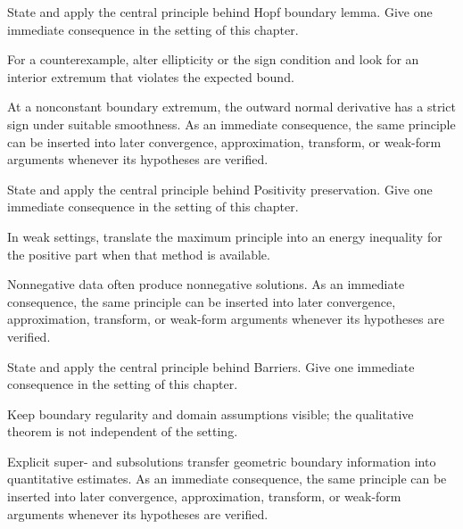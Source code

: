 \begin{exercise}\label{exr:iii27-06}
State and apply the central principle behind Hopf boundary lemma. Give one immediate consequence in the setting of this chapter.
\end{exercise}
\begin{hint}
For a counterexample, alter ellipticity or the sign condition and look for an interior extremum that violates the expected bound.
\end{hint}
\begin{solution}
At a nonconstant boundary extremum, the outward normal derivative has a strict sign under suitable smoothness. As an immediate consequence, the same principle can be inserted into later convergence, approximation, transform, or weak-form arguments whenever its hypotheses are verified.
\end{solution}

\begin{exercise}\label{exr:iii27-07}
State and apply the central principle behind Positivity preservation. Give one immediate consequence in the setting of this chapter.
\end{exercise}
\begin{hint}
In weak settings, translate the maximum principle into an energy inequality for the positive part when that method is available.
\end{hint}
\begin{solution}
Nonnegative data often produce nonnegative solutions. As an immediate consequence, the same principle can be inserted into later convergence, approximation, transform, or weak-form arguments whenever its hypotheses are verified.
\end{solution}

\begin{exercise}\label{exr:iii27-08}
State and apply the central principle behind Barriers. Give one immediate consequence in the setting of this chapter.
\end{exercise}
\begin{hint}
Keep boundary regularity and domain assumptions visible; the qualitative theorem is not independent of the setting.
\end{hint}
\begin{solution}
Explicit super- and subsolutions transfer geometric boundary information into quantitative estimates. As an immediate consequence, the same principle can be inserted into later convergence, approximation, transform, or weak-form arguments whenever its hypotheses are verified.
\end{solution}


